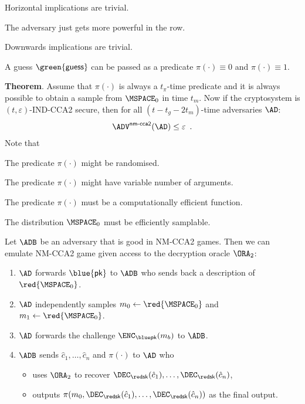 \documentclass[landscape,footrule]{foils}
\renewcommand{\PK}{{\blue{\mathsf{pk}}}}
\newcommand{\GUESS}{\green{\mathsf{guess}}}
\begin{document}
Horizontal implications are trivial.
\begin{bullets}
 \item The adversary just gets more powerful in the row. 
\end{bullets}

Downwards implications are trivial.
\begin{bullets}
  \item A guess $\GUESS$ can be passed as a predicate $\pi(\cdot)\equiv 0$ and $\pi(\cdot)\equiv 1$. 
\end{bullets}



\textbf{Theorem}. Assume that $\pi(\cdot)$ is always a $t_\pi$-time
predicate and it is always possible to obtain a sample from $\MSPACE_0$
in time $t_m$. Now if the cryptosystem is $(t,\varepsilon)$-IND-CCA2
secure, then for all $(t-t_g-2t_m)$-time adversaries $\AD$:
\begin{align*}
  \advNMCCAIIXX{}{\AD}\leq\varepsilon\enspace.
\end{align*}
\vskip 1.0cm
Note that
\begin{triangles}
\item The predicate $\pi(\cdot)$ might be randomised.
\item The predicate $\pi(\cdot)$ might have variable number of
  arguments.
\item The predicate $\pi(\cdot)$ must be a computationally  efficient function.
\item The distribution $\MSPACE_0$ must be efficiently samplable.
\end{triangles}


Let $\ADB$ be an adversary that is good in NM-CCA2 games. Then we can
emulate NM-CCA2 game given access to the decryption oracle $\ORA_2$:
\begin{enumerate}
  \item $\AD$ forwards $\PK$ to $\ADB$ who sends back a description of $\red{\MSPACE_0}$. 
  \item $\AD$ independently samples $m_0\gets\red{\MSPACE_0}$ and $m_1\gets\red{\MSPACE_0}$.
  \item $\AD$ forwards the challenge $\enc{m_b}$ to $\ADB$.
  \item $\ADB$ sends $\hat{c}_1,\ldots,\hat{c}_n$ and
    $\pi(\cdot)$ to $\AD$ who 
    \begin{itemize}
      \item uses $\ORA_2$ to recover $\dec{\hat{c}_1},\ldots,\dec{\hat{c}_n}$,
      \item outputs $\pi(m_0,\dec{\hat{c}_1},\ldots,\dec{\hat{c}_n})$ as the final output.
    \end{itemize}
\end{enumerate}
\end{document}

